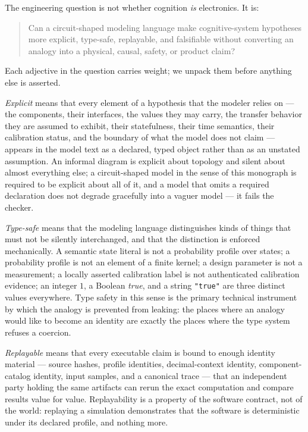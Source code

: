 The engineering question is not whether cognition \emph{is} electronics. It
is:

\begin{quote}
Can a circuit-shaped modeling language make cognitive-system hypotheses more
explicit, type-safe, replayable, and falsifiable without converting an analogy
into a physical, causal, safety, or product claim?
\end{quote}

Each adjective in the question carries weight; we unpack them before anything
else is asserted.

\emph{Explicit} means that every element of a hypothesis that the modeler
relies on --- the components, their interfaces, the values they may carry, the
transfer behavior they are assumed to exhibit, their statefulness, their time
semantics, their calibration status, and the boundary of what the model does
not claim --- appears in the model text as a declared, typed object rather
than as an unstated assumption. An informal diagram is explicit about
topology and silent about almost everything else; a circuit-shaped model in
the sense of this monograph is required to be explicit about all of it, and a
model that omits a required declaration does not degrade gracefully into a
vaguer model --- it fails the checker.

\emph{Type-safe} means that the modeling language distinguishes kinds of
things that must not be silently interchanged, and that the distinction is
enforced mechanically. A semantic state literal is not a probability profile
over states; a probability profile is not an element of a finite kernel; a
design parameter is not a measurement; a locally asserted calibration label is
not authenticated calibration evidence; an integer $1$, a Boolean
\emph{true}, and a string \texttt{"true"} are three distinct values
everywhere. Type safety in this sense is the primary technical instrument by
which the analogy is prevented from leaking: the places where an analogy
would like to become an identity are exactly the places where the type system
refuses a coercion.

\emph{Replayable} means that every executable claim is bound to enough
identity material --- source hashes, profile identities, decimal-context
identity, component-catalog identity, input samples, and a canonical trace ---
that an independent party holding the same artifacts can rerun the exact
computation and compare results value for value. Replayability is a property
of the software contract, not of the world: replaying a simulation
demonstrates that the software is deterministic under its declared profile,
and nothing more.

